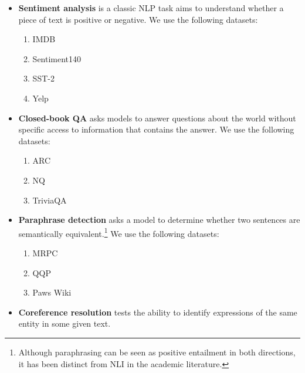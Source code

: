 \begin{itemize}[leftmargin=*]
    We use the following datasets:
    \begin{enumerate}
        \item COPA \citep{SSS112418}
        \item HellaSwag \citep{zellers-etal-2019-hellaswag}
        \item PiQA \citep{Bisk2020}
        \item StoryCloze \citep{mostafazadeh-etal-2016-corpus}
    \end{enumerate}
    \item \textbf{Sentiment analysis} is a classic NLP task aims to understand whether a piece of text is positive or negative. 
    We use the following datasets:
    \begin{enumerate}
        \item IMDB \citep{maas-EtAl:2011:ACL-HLT2011}
        \item Sentiment140 \citep{go2009twitter}
        \item SST-2 \citep{socher-etal-2013-recursive}
        \item Yelp \citep{yelpdataset}
    \end{enumerate}
    \item \textbf{Closed-book QA} asks models to answer questions about the world without specific access to information that contains the answer. 
    We use the following datasets:
    \begin{enumerate}
        \item ARC \citep{clark2018think}
        \item NQ \citep{orqa,kwiatkowski2019natural}
        \item TriviaQA \cite{JoshiTriviaQA2017}
    \end{enumerate}
    \item \textbf{Paraphrase detection} asks a model to determine whether two sentences are semantically equivalent.\footnote{Although paraphrasing can be seen as positive entailment in both directions, it has been distinct from NLI in the academic literature.}
    We use the following datasets:
    \begin{enumerate}
        \item MRPC \citep{dolan-brockett-2005-automatically}
        \item QQP \citep[see]{wang-etal-2018-glue}
        \item Paws Wiki \citep{zhang-etal-2019-paws}
    \end{enumerate}
    \item \textbf{Coreference resolution} tests the ability to identify expressions of the same entity in some given text.

\end{itemize}
